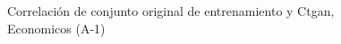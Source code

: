 \begin{figure}[H]
    \centering
    
    \caption{Correlación de conjunto original de entrenamiento y Ctgan, Economicos (A-1)}
    \label{pairwise-economicos-a-1-ctgan}
\end{figure}